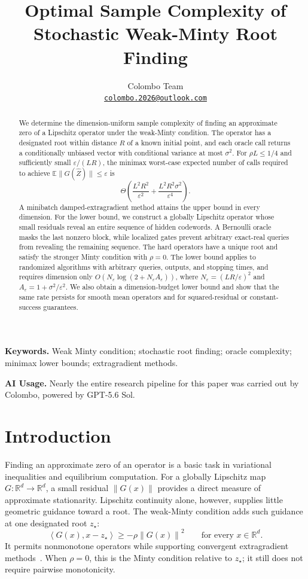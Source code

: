 \documentclass[11pt,a4paper]{article}
\title{Optimal Sample Complexity of\\Stochastic Weak-Minty Root Finding}
\author{Colombo Team\\[3pt]
\small\href{mailto:colombo.2026@outlook.com}{\texttt{colombo.2026@outlook.com}}}
\date{}
\newcommand{\R}{\mathbb R}
\newcommand{\E}{\mathbb E}
\newcommand{\eps}{\varepsilon}
\newcommand{\norm}[1]{\left\lVert #1\right\rVert}
\newcommand{\inner}[2]{\left\langle #1,#2\right\rangle}
\theoremstyle{definition}
\theoremstyle{remark}
\begin{document}
\maketitle
\begin{abstract}
We determine the dimension-uniform sample complexity of finding an approximate
zero of a Lipschitz operator under the weak-Minty condition. The operator has
a designated root within distance $R$ of a known initial point, and each oracle
call returns a conditionally unbiased vector with conditional variance at most
$\sigma^2$. For $\rho L\le1/4$ and sufficiently small $\eps/(LR)$, the minimax
worst-case expected number of calls required to achieve
$\E\|G(\widehat Z)\|\le\eps$ is
\[
\Theta\!\left(\frac{L^2R^2}{\eps^2}
       +\frac{L^2R^2\sigma^2}{\eps^4}\right).
\]
A minibatch damped-extragradient method attains the upper bound in every
dimension. For the lower bound, we construct a globally Lipschitz operator
whose small residuals reveal an entire sequence of hidden codewords. A
Bernoulli oracle masks the last nonzero block, while localized gates prevent
arbitrary exact-real queries from revealing the remaining sequence.
The hard operators have a unique root and satisfy the stronger Minty condition
with $\rho=0$. The lower bound applies to randomized algorithms with arbitrary
queries, outputs, and stopping times, and requires dimension only
$O(N_\eps\log(2+N_\eps A_\eps))$, where
$N_\eps=(LR/\eps)^2$ and $A_\eps=1+\sigma^2/\eps^2$.
We also obtain a dimension-budget lower bound and show that the same rate
persists for smooth mean operators and for squared-residual or constant-success
guarantees.
\end{abstract}

\noindent\textbf{Keywords.} Weak Minty condition; stochastic root finding;
oracle complexity; minimax lower bounds; extragradient methods.
\par\medskip
\begin{samepage}
\noindent\textbf{AI Usage.}
Nearly the entire research pipeline for this paper was carried out by
Colombo, powered by GPT-5.6 Sol.
\par
\end{samepage}

\section{Introduction}\label{sec:introduction}

Finding an approximate zero of an operator is a basic task in variational
inequalities and equilibrium computation. For a globally Lipschitz map
$G:\R^d\to\R^d$, a small residual $\|G(x)\|$ provides a direct measure of
approximate stationarity. Lipschitz continuity alone, however, supplies little
geometric guidance toward a root. The weak-Minty condition adds such guidance
at one designated root $z_\star$:
\begin{equation}\label{eq:wm-intro}
 \inner{G(x)}{x-z_\star}\ge-\rho\norm{G(x)}^2
 \qquad\text{for every }x\in\R^d.
\end{equation}
It permits nonmonotone operators while supporting convergent extragradient
methods~\cite{ddj2021}. When $\rho=0$, this is the Minty condition relative to
$z_\star$; it still does not require pairwise monotonicity.
\end{document}
